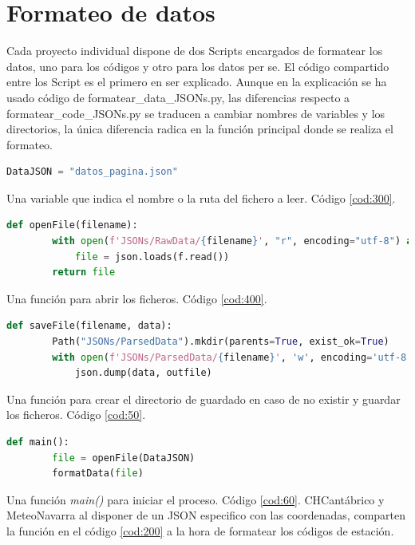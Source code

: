 \section{Formateo de datos}
Cada proyecto individual dispone de dos Scripts encargados de formatear los datos, uno para los códigos y otro para los datos per se.\newline
\newline
El código compartido entre los Script es el primero en ser explicado. Aunque en la explicación se ha usado código de formatear\_data\_JSONs.py, las diferencias respecto a formatear\_code\_JSONs.py se traducen a cambiar nombres de variables y los directorios, la única diferencia radica en la función principal donde se realiza el formateo.

\begin{lstlisting}[language=Python, caption={Declaración variable del JSON que se desea usar}, label=cod:300]
	DataJSON = "datos_pagina.json"
\end{lstlisting}

Una variable que indica el nombre o la ruta del fichero a leer. Código \ref{cod:300}.

\begin{lstlisting}[language=Python, caption={Declaración función \textit{openFile()}}, label=cod:400]
	def openFile(filename):
		with open(f'JSONs/RawData/{filename}', "r", encoding="utf-8") as f:
			file = json.loads(f.read())
		return file
\end{lstlisting}

Una función para abrir los ficheros. Código \ref{cod:400}.

\begin{lstlisting}[language=Python, caption={Declaración función \textit{saveFile()}}, label=cod:50]
	def saveFile(filename, data):
		Path("JSONs/ParsedData").mkdir(parents=True, exist_ok=True)
		with open(f'JSONs/ParsedData/{filename}', 'w', encoding='utf-8') as outfile:
			json.dump(data, outfile)
\end{lstlisting}

Una función para crear el directorio de guardado en caso de no existir y guardar los ficheros. Código \ref{cod:50}.

\begin{lstlisting}[language=Python, caption={Declaración función \textit{main()}}, label=cod:60]
	def main():
		file = openFile(DataJSON)
		formatData(file)
\end{lstlisting}

Una función \textit{main()} para iniciar el proceso. Código \ref{cod:60}.\newline
\newline
CHCantábrico y MeteoNavarra al disponer de un JSON especifico con las coordenadas, comparten la función en el código \ref{cod:200} a la hora de formatear los códigos de estación.

